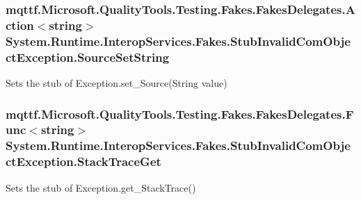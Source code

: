 \hypertarget{class_system_1_1_runtime_1_1_interop_services_1_1_fakes_1_1_stub_invalid_com_object_exception_a7761815c2c6341dfda1046c9afa4935f}{
\subsubsection[{Source\-Set\-String}]{\setlength{\rightskip}{0pt plus 5cm}mqttf.\-Microsoft.\-Quality\-Tools.\-Testing.\-Fakes.\-Fakes\-Delegates.\-Action$<$string$>$ System.\-Runtime.\-Interop\-Services.\-Fakes.\-Stub\-Invalid\-Com\-Object\-Exception.\-Source\-Set\-String}}\label{class_system_1_1_runtime_1_1_interop_services_1_1_fakes_1_1_stub_invalid_com_object_exception_a7761815c2c6341dfda1046c9afa4935f}


Sets the stub of Exception.\-set\-\_\-\-Source(\-String value)

\hypertarget{class_system_1_1_runtime_1_1_interop_services_1_1_fakes_1_1_stub_invalid_com_object_exception_a3a8f553ccafd43ab7c1ca5cf224387d7}{
\subsubsection[{Stack\-Trace\-Get}]{\setlength{\rightskip}{0pt plus 5cm}mqttf.\-Microsoft.\-Quality\-Tools.\-Testing.\-Fakes.\-Fakes\-Delegates.\-Func$<$string$>$ System.\-Runtime.\-Interop\-Services.\-Fakes.\-Stub\-Invalid\-Com\-Object\-Exception.\-Stack\-Trace\-Get}}\label{class_system_1_1_runtime_1_1_interop_services_1_1_fakes_1_1_stub_invalid_com_object_exception_a3a8f553ccafd43ab7c1ca5cf224387d7}


Sets the stub of Exception.\-get\-\_\-\-Stack\-Trace()

